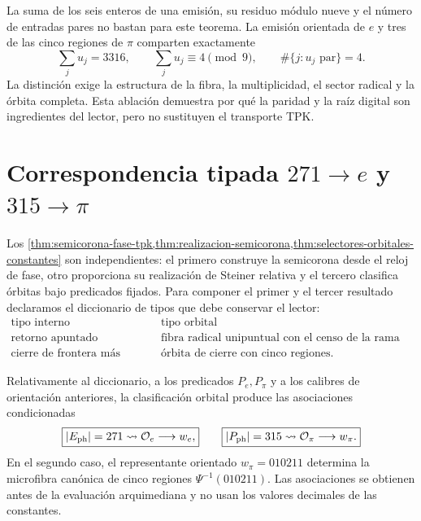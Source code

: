 La suma de los seis enteros de una emisión, su residuo módulo nueve y el
número de entradas pares no bastan para este teorema. La emisión orientada
de \(e\) y tres de las cinco regiones de \(\pi\) comparten exactamente
\[
 \sum_j u_j=3316,
 \qquad
 \sum_j u_j\equiv4\pmod9,
 \qquad
 \#\{j:u_j\text{ par}\}=4.
\]
La distinción exige la estructura de la fibra, la multiplicidad, el sector
radical y la órbita completa. Esta ablación demuestra por qué la paridad y
la raíz digital son ingredientes del lector, pero no sustituyen el
transporte TPK\@.

\section{Correspondencia tipada \texorpdfstring{\(271\to e\) y
\(315\to\pi\)}{271 a e y 315 a pi}}

Los
\cref{thm:semicorona-fase-tpk,thm:realizacion-semicorona,thm:selectores-orbitales-constantes}
son independientes: el primero construye
la semicorona desde el reloj de fase, otro proporciona su realización de
Steiner relativa y el tercero clasifica órbitas bajo predicados fijados. Para
componer el primer y el tercer resultado declaramos el
diccionario de tipos que debe conservar el lector:
\[
\begin{array}{c|c}
\text{tipo interno}&\text{tipo orbital}\\
\hline
\text{retorno apuntado bidireccional}&
\text{fibra radical unipuntual con el censo de la rama regional}\\
\text{cierre de frontera más lateral}&
\text{órbita de cierre con cinco regiones}.
\end{array}
\]

\begin{corollary}
\label{cor:lectores-enteros-relativos}
Relativamente al diccionario, a los predicados \(P_e,P_\pi\) y a los
calibres de orientación anteriores, la clasificación orbital produce las
asociaciones condicionadas
\[
 \boxed{|E_{\rm ph}|=271\rightsquigarrow \mathcal O_e
        \longrightarrow w_e,}
 \qquad
 \boxed{|P_{\rm ph}|=315\rightsquigarrow \mathcal O_\pi
        \longrightarrow w_\pi.}
\]
En el segundo caso, el representante orientado \(w_\pi=010211\) determina la
microfibra canónica de cinco regiones \(\Psi^{-1}(010211)\). Las asociaciones
se obtienen antes de la evaluación arquimediana y no usan los valores
decimales de las constantes.
\end{corollary}

